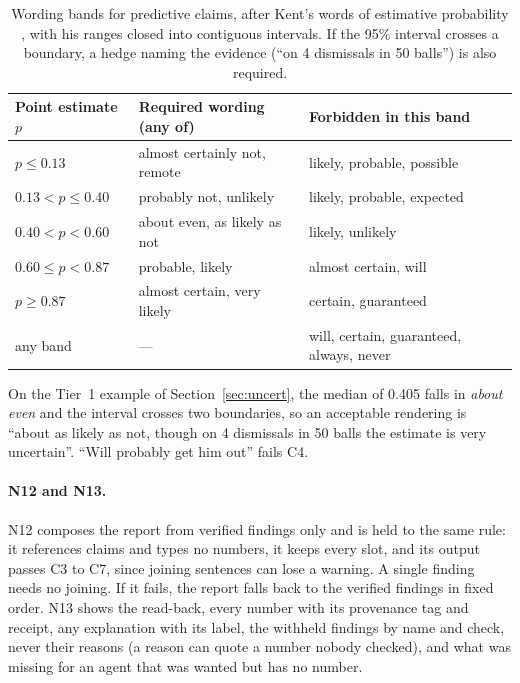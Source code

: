 \documentclass[11pt,a4paper]{article}
\begin{document}
\begin{table}[htbp]
\centering
\footnotesize
\renewcommand{\arraystretch}{1.2}
\begin{tabular}{@{}>{\raggedright\arraybackslash}p{3.2cm}
                  >{\raggedright\arraybackslash}p{5.4cm}
                  >{\raggedright\arraybackslash}p{5.6cm}@{}}
\toprule
\textbf{Point estimate $p$} & \textbf{Required wording (any of)} & \textbf{Forbidden in this band} \\
\midrule
$p \leq 0.13$ & almost certainly not, remote & likely, probable, possible \\
$0.13 < p \leq 0.40$ & probably not, unlikely & likely, probable, expected \\
$0.40 < p < 0.60$ & about even, as likely as not & likely, unlikely \\
$0.60 \leq p < 0.87$ & probable, likely & almost certain, will \\
$p \geq 0.87$ & almost certain, very likely & certain, guaranteed \\
any band & --- & will, certain, guaranteed, always, never \\
\bottomrule
\end{tabular}
\caption{Wording bands for predictive claims, after Kent's words of
estimative probability \cite{kent}, with his ranges closed into contiguous
intervals. If the 95\% interval crosses a boundary, a hedge naming the evidence
(``on 4 dismissals in 50 balls'') is also required.}
\label{tab:lexicon}
\end{table}

\noindent On the Tier~1 example of Section~\ref{sec:uncert}, the median of 0.405
falls in \emph{about even} and the interval crosses two boundaries, so an
acceptable rendering is ``about as likely as not, though on 4 dismissals in 50
balls the estimate is very uncertain''. ``Will probably get him out'' fails C4.

\paragraph{N12 and N13.} N12 composes the report from verified findings only and
is held to the same rule: it references claims and types no numbers, it keeps every
slot, and its output passes C3 to C7, since joining sentences can lose a warning.
A single finding needs no joining. If it fails, the report falls back to the verified
findings in fixed order. N13 shows the read-back, every number with its
provenance tag and receipt, any explanation with its label, the withheld
findings by name and check, never their reasons (a reason can quote a number nobody
checked), and what was missing for an agent that was wanted but has no number.
\end{document}
